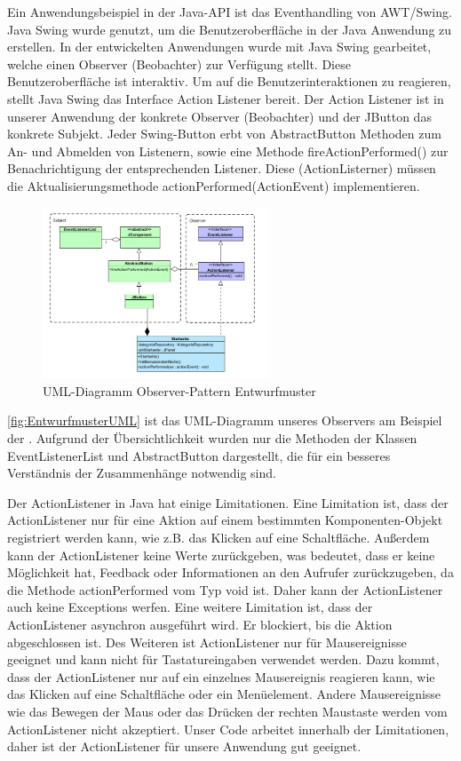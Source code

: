 Ein Anwendungsbeispiel in der Java-API ist das Eventhandling von AWT/Swing. Java Swing wurde genutzt, um die Benutzeroberfläche in der Java Anwendung zu erstellen. In der entwickelten Anwendungen wurde mit Java Swing gearbeitet, welche einen Observer (Beobachter) zur Verfügung stellt. Diese Benutzeroberfläche ist interaktiv. Um auf die Benutzerinteraktionen zu reagieren, stellt Java Swing das Interface Action Listener bereit. Der Action Listener ist in unserer Anwendung der konkrete Observer (Beobachter) und der JButton das konkrete Subjekt. Jeder Swing-Button erbt von AbstractButton Methoden zum An- und Abmelden von Listenern, sowie eine Methode fireActionPerformed() zur Benachrichtigung der entsprechenden Listener. Diese (ActionListerner) müssen die Aktualisierungsmethode actionPerformed(ActionEvent) implementieren.
\begin{figure}[ht]
	\centering
	\includegraphics[width=0.60\textwidth]{Bilder/Entwurfsmuster-UML.png} 
	\caption{UML-Diagramm Observer-Pattern Entwurfmuster}
	\label{fig:EntwurfmusterUML}
\end{figure}
\autoref{fig:EntwurfmusterUML} ist das UML-Diagramm unseres Observers am Beispiel der \href{https://github.com/MichaelaHaag/RezeptApp/blob/main/0-Plugins/src/main/java/de/rezeptapp/plugins/gui/Startseite.java}{}. 
Aufgrund der Übersichtlichkeit wurden nur die Methoden der Klassen EventListenerList und AbstractButton dargestellt, die für ein besseres Verständnis der Zusammenhänge notwendig sind. 

Der ActionListener in Java hat einige Limitationen. Eine Limitation ist, dass der ActionListener nur für eine Aktion auf einem bestimmten Komponenten-Objekt registriert werden kann, wie z.B. das Klicken auf eine Schaltfläche. Außerdem kann der ActionListener keine Werte zurückgeben, was bedeutet, dass er keine Möglichkeit hat, Feedback oder Informationen an den Aufrufer zurückzugeben, da die Methode actionPerformed vom Typ void ist. Daher kann der ActionListener auch keine Exceptions werfen.
Eine weitere Limitation ist, dass der ActionListener asynchron ausgeführt wird. Er blockiert, bis die Aktion abgeschlossen ist.
Des Weiteren ist ActionListener nur für Mausereignisse geeignet und kann nicht für Tastatureingaben verwendet werden. Dazu kommt, dass der ActionListener nur auf ein einzelnes Mausereignis reagieren kann, wie das Klicken auf eine Schaltfläche oder ein Menüelement. Andere Mausereignisse wie das Bewegen der Maus oder das Drücken der rechten Maustaste werden vom ActionListener nicht akzeptiert. Unser Code arbeitet innerhalb der Limitationen, daher ist der ActionListener für unsere Anwendung gut geeignet. 